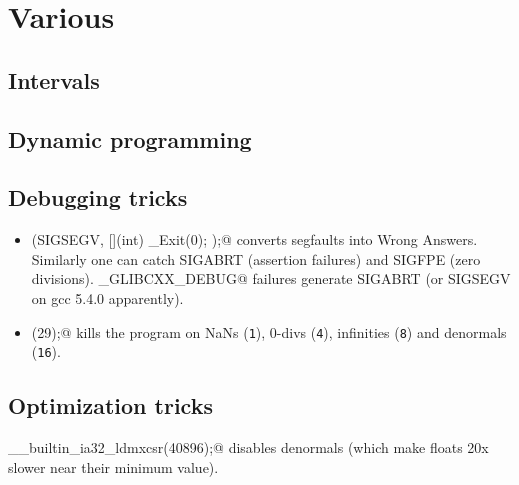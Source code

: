 \chapter{Various}

\section{Intervals}


\section{Dynamic programming}

\section{Debugging tricks}
	\begin{itemize}
		\item \verb@signal(SIGSEGV, [](int) { _Exit(0); });@ converts segfaults into Wrong Answers.
			Similarly one can catch SIGABRT (assertion failures) and SIGFPE (zero divisions).
			\verb@_GLIBCXX_DEBUG@ failures generate SIGABRT (or SIGSEGV on gcc 5.4.0 apparently).
		\item \verb@feenableexcept(29);@ kills the program on NaNs (\texttt 1), 0-divs (\texttt 4), infinities (\texttt 8) and denormals (\texttt{16}).
	\end{itemize}

\section{Optimization tricks}
	\verb@__builtin_ia32_ldmxcsr(40896);@ disables denormals (which make floats 20x slower near their minimum value).
